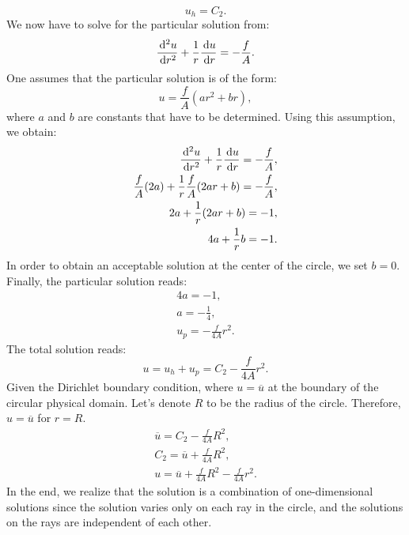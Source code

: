 \documentclass[a4paper,12pt]{article}
\newcommand{\intd}{\,{\rm d}}
\begin{document}
\begin{equation}
u_h = C_2.
\end{equation}
We now have to solve for the particular solution from:
\begin{equation}
 \frac{\intd^2 u}{\intd r^2} + \frac{1}{r}\frac{\intd u}{\intd r} = -\frac{f}{A}.
\end{equation}
One assumes that the particular solution is of the form:
\begin{equation}
 u = \frac{f}{A}(ar^2 + br),
\end{equation}
where $a$ and $b$ are constants that have to be determined. 
Using this assumption, we obtain:
\begin{eqnarray}
 \frac{\intd^2 u}{\intd r^2} + \frac{1}{r}\frac{\intd u}{\intd r} = -\frac{f}{A},\\
\frac{f}{A}(2a)+ \frac{1}{r}\frac{f}{A}(2ar + b)= -\frac{f}{A},\\
2a  + \frac{1}{r}(2ar + b)= -1,\\
4a  + \frac{1}{r} b= -1.
\end{eqnarray}
In order to obtain an acceptable solution at the center of the circle, we set $b = 0$. Finally, the particular solution reads:
\begin{eqnarray}
4a = -1,\\
a = -\frac{1}{4},\\
u_p = -\frac{f}{4A}r^2.
\end{eqnarray}
The total solution reads:
\begin{equation}
 u = u_h + u_p = C_2 - \frac{f}{4A}r^2.
\end{equation}
Given the Dirichlet boundary condition, where $u = \overline{u}$ at the boundary of the circular physical domain. Let's denote $R$ to be the radius of the circle. Therefore, $u = \overline{u}$  for $r = R$. 
\begin{eqnarray}
 \overline{u} = C_2 - \frac{f}{4A}R^2,\\
C_2 = \overline{u} + \frac{f}{4A}R^2,\\
u = \overline{u} + \frac{f}{4A}R^2 - \frac{f}{4A}r^2.
\end{eqnarray}
In the end, we realize that the solution is a combination of one-dimensional solutions since the solution varies only on each ray in the circle, and the solutions on the rays are independent of each other. 
\end{document}
